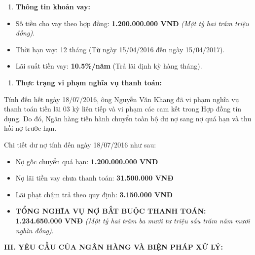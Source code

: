 \documentclass[12pt,a4paper]{article}
\begin{document}
\begin{enumerate}[label=\arabic*., leftmargin=*, itemsep=2pt, topsep=2pt, parsep=0pt]
  \item \textbf{Thông tin khoản vay:}
\end{enumerate}
\begin{itemize}[leftmargin=*, itemsep=2pt, topsep=2pt, parsep=0pt]
  \item Số tiền cho vay theo hợp đồng: \textbf{1.200.000.000 VNĐ} \textit{(Một tỷ hai trăm triệu đồng)}.
  \item Thời hạn vay: 12 tháng (Từ ngày 15/04/2016 đến ngày 15/04/2017).
  \item Lãi suất tiền vay: \textbf{10.5\%/năm} (Trả lãi định kỳ hàng tháng).

\end{itemize}
\begin{enumerate}[label=\arabic*., leftmargin=*, itemsep=2pt, topsep=2pt, parsep=0pt]
  \item \textbf{Thực trạng vi phạm nghĩa vụ thanh toán:}
\end{enumerate}
Tính đến hết ngày 18/07/2016, ông Nguyễn Văn Khang đã vi phạm nghĩa vụ thanh toán tiền lãi 03 kỳ liên tiếp và vi phạm các cam kết trong Hợp đồng tín dụng. Do đó, Ngân hàng tiến hành chuyển toàn bộ dư nợ sang nợ quá hạn và thu hồi nợ trước hạn.


Chi tiết dư nợ tính đến ngày 18/07/2016 như sau:

\begin{itemize}[leftmargin=*, itemsep=2pt, topsep=2pt, parsep=0pt]
  \item Nợ gốc chuyển quá hạn: \textbf{1.200.000.000 VNĐ}
  \item Nợ lãi tiền vay chưa thanh toán: \textbf{31.500.000 VNĐ}
  \item Lãi phạt chậm trả theo quy định: \textbf{3.150.000 VNĐ}
  \item \textbf{TỔNG NGHĨA VỤ NỢ BẮT BUỘC THANH TOÁN:} \textbf{1.234.650.000 VNĐ} \textit{(Một tỷ hai trăm ba mươi tư triệu sáu trăm năm mươi nghìn đồng)}.


\end{itemize}

\vspace{0.3cm}\noindent\textbf{\large III. YÊU CẦU CỦA NGÂN HÀNG VÀ BIỆN PHÁP XỬ LÝ:}\\[0.15cm]
\end{document}
